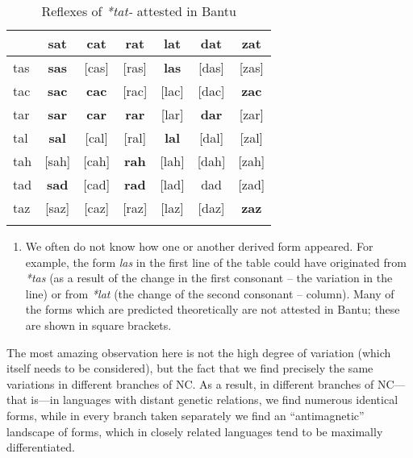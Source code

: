 \begin{table}
\caption{\label{tab:4:8}Reflexes of \textit{*tat-} attested in Bantu}


\begin{tabularx}{.66\textwidth}{lcccccc}
\lsptoprule
& \color{red}sat &\color{red} cat &\color{red} rat &\color{red} lat & \color{red}dat & \color{red}zat\\
\midrule
\color{red}tas & \textbf{sas} & \color{blue}[cas] &\color{blue} [ras] & \textbf{las} &\color{blue} [das] &\color{blue}[zas]\\
\color{red}tac & \textbf{sac} & \textbf{cac} & \color{blue}[rac] & \color{blue}[lac] &\color{blue} [dac] & \textbf{zac}\\
\color{red}tar & \textbf{sar} & \textbf{car} & \textbf{rar} & \color{blue}[lar] & \textbf{dar} &\color{blue} [zar]\\
\color{red}tal & \textbf{sal} &\color{blue} [cal] &\color{blue} [ral] & \textbf{lal} &\color{blue} [dal] &\color{blue} [zal]\\
\color{red}tah &\color{blue} [sah] &\color{blue} [cah] & \textbf{rah} & \color{blue}[lah] &\color{blue} [dah] & \color{blue}[zah]\\
\color{red}tad & \textbf{sad} & \color{blue}[cad] & \textbf{rad} &\color{blue} [lad] & dad & \color{blue}[zad]\\
\color{red}taz &  \color{blue}[saz] &\color{blue} [caz] &\color{blue} [raz] &\color{blue} [laz] &\color{blue} [daz] & \textbf{zaz}\\
\lspbottomrule
\end{tabularx}
\end{table}
\begin{enumerate}
\item We often do not know how one or another derived form appeared. For example, the form \textit{las} in the first line of the table could have originated from \textit{*tas} (as a result of the change in the first consonant – the variation in the line) or from \textit{*lat} (the change of the second consonant – column). Many of the forms which are predicted theoretically are not attested in Bantu; these are shown in square brackets. 
\end{enumerate}
The most amazing observation here is not the high degree of variation (which itself needs to be considered), but the fact that we find precisely the same variations in different branches of NC. As a result, in different branches of NC—that is—in languages with distant genetic relations, we find numerous identical forms, while in every branch taken separately we find an “antimagnetic” landscape of forms, which in closely related languages tend to be maximally differentiated. 

